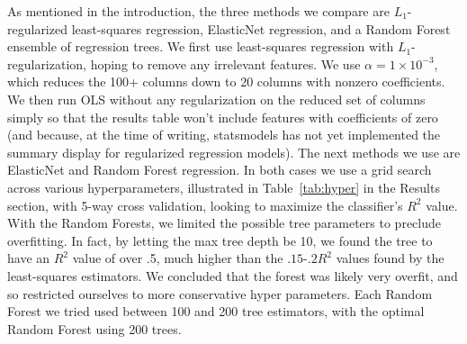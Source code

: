 \documentclass[11pt]{article}
\begin{document}
As mentioned in the introduction, the three methods we compare are $L_1$-regularized least-squares regression, ElasticNet regression, and a Random Forest ensemble of regression trees. We first use least-squares regression with \(L_1\)-regularization, hoping to remove any irrelevant features.
We use $\alpha=1\times10^{-3}$, which reduces
the 100+ columns down to 20 columns with nonzero
coefficients. We then run OLS without any regularization on the reduced set
of columns simply so that the results table won't include features with coefficients of zero (and because, at the time of writing, statsmodels has not yet implemented the summary display for regularized regression models). The next methods we use are ElasticNet and Random Forest regression. In both
cases we use a grid search across various hyperparameters, illustrated in Table~\ref{tab:hyper} in the Results section, with 5-way cross validation, looking to
maximize the classifier's \(R^2\) value. With the Random Forests, we
limited the possible tree parameters to preclude overfitting. In fact,
by letting the max tree depth be 10, we found the tree to have an
\(R^2\) value of over .5, much higher than the \(.15\)-\(.2 R^2\) values
found by the least-squares estimators. We concluded that the forest was likely
very overfit, and so restricted ourselves to more conservative hyper
parameters. Each Random Forest we tried used between 100 and 200 tree estimators, with the optimal Random Forest using 200 trees.
\newpage
\end{document}
